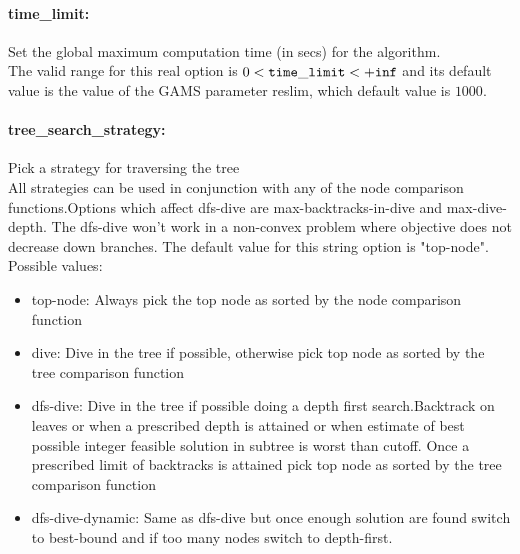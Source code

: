 \paragraph{time\_limit:} Set the global maximum computation time (in secs) for the algorithm. $\;$ \\
 The valid range for this real option is 
$0 <  {\tt time\_limit } <  {\tt +inf}$
and its default value is the value of the GAMS parameter reslim, which default value is $1000$.


\paragraph{tree\_search\_strategy:} Pick a strategy for traversing the tree $\;$ \\
 All strategies can be used in conjunction with
any of the node comparison functions.Options
which affect dfs-dive are max-backtracks-in-dive
and max-dive-depth. The dfs-dive won't work in a
non-convex problem where objective does not
decrease down branches.
The default value for this string option is "top-node".
\\ 
Possible values:
\begin{itemize}
   \item top-node:  Always pick the top node as sorted by the node
comparison function
   \item dive: Dive in the tree if possible, otherwise pick
top node as sorted by the tree comparison
function
   \item dfs-dive: Dive in the tree if possible doing a depth
first search.Backtrack on leaves or when a
prescribed depth is attained or when estimate
of best possible integer feasible solution in
subtree is worst than cutoff. Once a prescribed
limit of backtracks is attained pick top node
as sorted by the tree comparison function
   \item dfs-dive-dynamic: Same as dfs-dive but once enough solution are
found switch to best-bound and if too many
nodes switch to depth-first.
\end{itemize}

